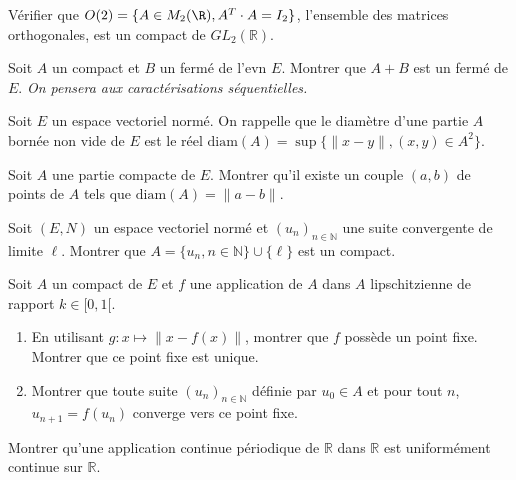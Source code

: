 \begin{exercice}
Vérifier que $O(2) = \{A \in M_2 (\R), A^T \cdot A = I_2\}$, l'ensemble des matrices orthogonales, est un compact de $GL_{2}(\mathbb{R})$.
\end{exercice}

\begin{exercice}
Soit $A$ un compact et $B$ un fermé de l'evn $E$.
Montrer que $A+B$ est un fermé de $E$.
\textit{On pensera aux caractérisations séquentielles.}
\end{exercice}

\begin{exercice}
Soit $E$ un espace vectoriel normé. On rappelle que le diamètre d'une partie $A$ bornée non vide de $E$ est le réel $\text{diam}(A) = \sup \{ \|x-y\|, (x,y) \in A^{2} \}$.

Soit $A$ une partie compacte de $E$. Montrer qu'il existe un couple $(a,b)$ de points de $A$ tels que $\text{diam}(A) = \|a-b\|$.
\end{exercice}

\begin{exercice}
Soit $(E, N)$ un espace vectoriel normé et $(u_{n})_{n \in \mathbb{N}}$ une suite convergente de limite $\ell$.
Montrer que $A = \{u_{n}, n \in \mathbb{N}\} \cup \{\ell\}$ est un compact.
\end{exercice}

\begin{exercice}
Soit $A$ un compact de $E$ et $f$ une application de $A$ dans $A$ lipschitzienne de rapport $k \in [0,1[$.
\begin{enumerate}
    \item En utilisant $g : x \mapsto \|x-f(x)\|$, montrer que $f$ possède un point fixe. Montrer que ce point fixe est unique.
    \item Montrer que toute suite $(u_{n})_{n \in \mathbb{N}}$ définie par $u_{0} \in A$ et pour tout $n$, $u_{n+1}=f(u_{n})$ converge vers ce point fixe.
\end{enumerate}
\end{exercice}

\begin{exercice}
Montrer qu'une application continue périodique de $\mathbb{R}$ dans $\mathbb{R}$ est uniformément continue sur $\mathbb{R}$.
\end{exercice}

